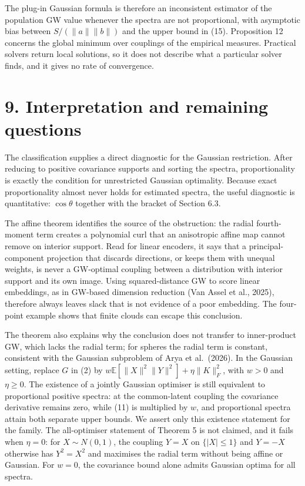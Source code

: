 \documentclass[
  british,
  11pt,
  a4paper,
]{article}
\begin{document}
The plug-in Gaussian formula is therefore an inconsistent estimator of
the population GW value whenever the spectra are not proportional, with
asymptotic bias between \(S/(\|a\|\|b\|)\) and the upper bound in (15).
Proposition 12 concerns the global minimum over couplings of the
empirical measures. Practical solvers return local solutions, so it does
not describe what a particular solver finds, and it gives no rate of
convergence.

\section{9. Interpretation and remaining
questions}\label{interpretation-and-remaining-questions}

The classification supplies a direct diagnostic for the Gaussian
restriction. After reducing to positive covariance supports and sorting
the spectra, proportionality is exactly the condition for unrestricted
Gaussian optimality. Because exact proportionality almost never holds
for estimated spectra, the useful diagnostic is quantitative:
\(\cos\theta\) together with the bracket of Section 6.3.

The affine theorem identifies the source of the obstruction: the radial
fourth-moment term creates a polynomial curl that an anisotropic affine
map cannot remove on interior support. Read for linear encoders, it says
that a principal-component projection that discards directions, or keeps
them with unequal weights, is never a GW-optimal coupling between a
distribution with interior support and its own image. Using
squared-distance GW to score linear embeddings, as in GW-based dimension
reduction (Van Assel et al., 2025), therefore always leaves slack that
is not evidence of a poor embedding. The four-point example shows that
finite clouds can escape this conclusion.

The theorem also explains why the conclusion does not transfer to
inner-product GW, which lacks the radial term; for spheres the radial
term is constant, consistent with the Gaussian subproblem of Arya et
al.~(2026). In the Gaussian setting, replace \(G\) in (2) by
\(w\mathbb E[\|X\|^2\|Y\|^2]+\eta\|K\|_F^2\), with \(w>0\) and
\(\eta\geq0\). The existence of a jointly Gaussian optimiser is still
equivalent to proportional positive spectra: at the common-latent
coupling the covariance derivative remains zero, while (11) is
multiplied by \(w\), and proportional spectra attain both separate upper
bounds. We assert only this existence statement for the family. The
all-optimiser statement of Theorem 5 is not claimed, and it fails when
\(\eta=0\): for \(X\sim N(0,1)\), the coupling \(Y=X\) on
\(\{|X|\leq1\}\) and \(Y=-X\) otherwise has \(Y^2=X^2\) and maximises
the radial term without being affine or Gaussian. For \(w=0\), the
covariance bound alone admits Gaussian optima for all spectra.
\end{document}
